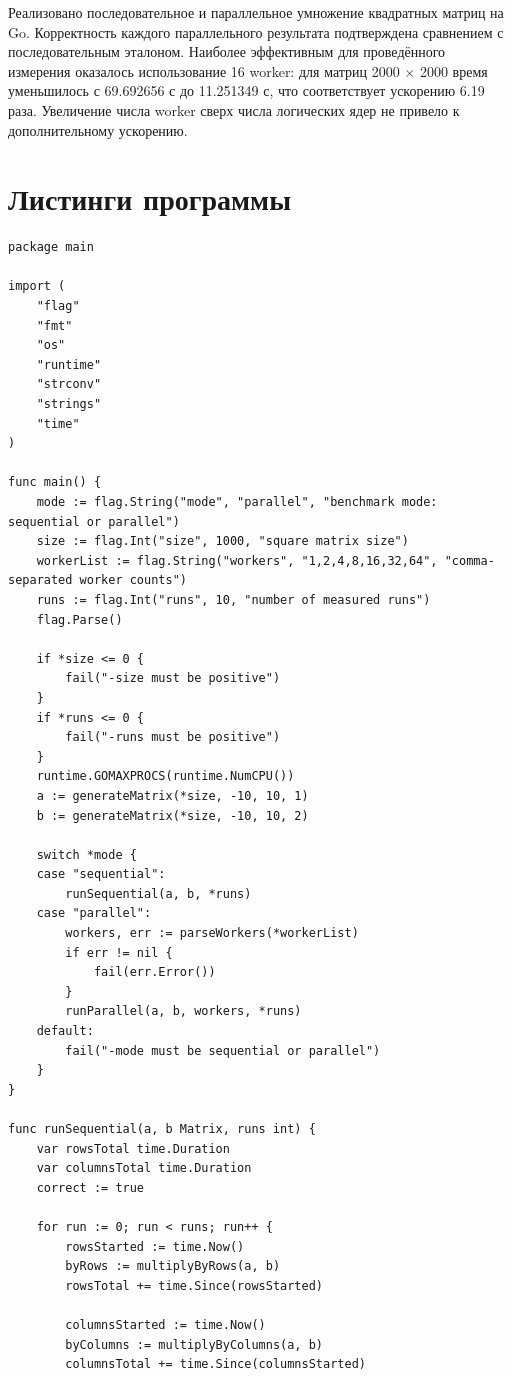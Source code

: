 \documentclass[a4paper,14pt]{extarticle}
\begin{document}
Реализовано последовательное и параллельное умножение квадратных матриц на Go.
Корректность каждого параллельного результата подтверждена сравнением с
последовательным эталоном. Наиболее эффективным для проведённого измерения
оказалось использование 16 worker: для матриц 2000 \texorpdfstring{$\times$}{x}
2000 время уменьшилось с 69.692656 с до 11.251349 с, что соответствует
ускорению 6.19 раза. Увеличение числа worker сверх числа логических ядер не
привело к дополнительному ускорению.

\appendix
\newpage
\section{Листинги программы}

\begin{lstlisting}[caption={Файл 	exttt{main.go}}]
package main

import (
    "flag"
    "fmt"
    "os"
    "runtime"
    "strconv"
    "strings"
    "time"
)

func main() {
    mode := flag.String("mode", "parallel", "benchmark mode: sequential or parallel")
    size := flag.Int("size", 1000, "square matrix size")
    workerList := flag.String("workers", "1,2,4,8,16,32,64", "comma-separated worker counts")
    runs := flag.Int("runs", 10, "number of measured runs")
    flag.Parse()

    if *size <= 0 {
        fail("-size must be positive")
    }
    if *runs <= 0 {
        fail("-runs must be positive")
    }
    runtime.GOMAXPROCS(runtime.NumCPU())
    a := generateMatrix(*size, -10, 10, 1)
    b := generateMatrix(*size, -10, 10, 2)

    switch *mode {
    case "sequential":
        runSequential(a, b, *runs)
    case "parallel":
        workers, err := parseWorkers(*workerList)
        if err != nil {
            fail(err.Error())
        }
        runParallel(a, b, workers, *runs)
    default:
        fail("-mode must be sequential or parallel")
    }
}

func runSequential(a, b Matrix, runs int) {
    var rowsTotal time.Duration
    var columnsTotal time.Duration
    correct := true

    for run := 0; run < runs; run++ {
        rowsStarted := time.Now()
        byRows := multiplyByRows(a, b)
        rowsTotal += time.Since(rowsStarted)

        columnsStarted := time.Now()
        byColumns := multiplyByColumns(a, b)
        columnsTotal += time.Since(columnsStarted)


\end{lstlisting}
\end{document}
